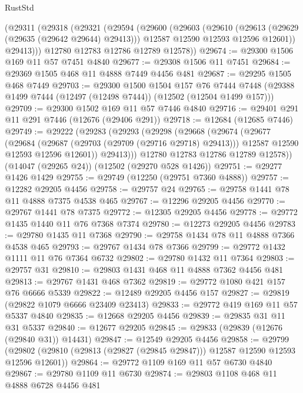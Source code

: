 \begin{lexlean}{RustStd}
\begin{coremodule}
    (@29311
      (@29318
        (@29321
          (@29594
            (@29600
              (@29603
                (@29610
                  (@29613 (@29629 (@29635 (@29642 @29644) @29413)))
                  @12587
                  @12590
                  @12593
                  @12596
                  @12601))
              @29413)))
        @12780
        @12783
        @12786
        @12789
        @12578))
@29674 := @29300 @1506 @169 @11 @57 @7451 @4840
@29677 := @29308 @1506 @11 @7451
@29684 := @29369 @1505 @468 @11 @4888 @7449 @4456 @481
@29687 := @29295 @1505 @468 @7449
@29703 := @29300
    @1500
    @1504
    @157
    @76
    @7444
    @7448
    (@29388 @1499 @7444 (@12497 (@12498 @7444)) (@12502 (@12504 @1499 @157)))
@29709 := @29300 @1502 @169 @11 @57 @7446 @4840
@29716 := @29401 @291 @11 @291 @7446 (@12676 (@29406 @291))
@29718 := @12684 (@12685 @7446)
@29749 := @29222
    (@29283
      (@29293
        (@29298
          (@29668
            (@29674
              (@29677
                (@29684
                  (@29687 (@29703 (@29709 (@29716 @29718) @29413)))
                  @12587
                  @12590
                  @12593
                  @12596
                  @12601))
              @29413)))
        @12780
        @12783
        @12786
        @12789
        @12578))
    (@14047 (@29265 @24))
    (@12502 (@29270 @528 @1426))
@29751 := @29277 @1426 @1429
@29755 := @29749 (@12250 (@29751 @7360 @4888))
@29757 := @12282 @29205 @4456
@29758 := @29757 @24
@29765 := @29758 @1441 @78 @11 @4888 @7375 @4538 @465
@29767 := @12296 @29205 @4456
@29770 := @29767 @1441 @78 @7375
@29772 := @12305 @29205 @4456
@29778 := @29772 @1435 @1440 @11 @76 @7368 @7374
@29780 := @12273 @29205 @4456
@29783 := @29780 @1435 @11 @7368
@29790 := @29758 @1434 @78 @11 @4888 @7366 @4538 @465
@29793 := @29767 @1434 @78 @7366
@29799 := @29772 @1432 @1111 @11 @76 @7364 @6732
@29802 := @29780 @1432 @11 @7364
@29803 := @29757 @31
@29810 := @29803 @1431 @468 @11 @4888 @7362 @4456 @481
@29813 := @29767 @1431 @468 @7362
@29819 := @29772 @1080 @421 @157 @76 @6666 @5339
@29822 := @12489 @29205 @4456 @157
@29827 := @29819 (@29822 @1079 @6666 @23409 @23413)
@29833 := @29772 @419 @169 @11 @57 @5337 @4840
@29835 := @12668 @29205 @4456
@29839 := @29835 @31 @11 @31 @5337
@29840 := @12677 @29205
@29845 := @29833 (@29839 (@12676 (@29840 @31)) @14431)
@29847 := @12549 @29205 @4456
@29858 := @29799
    (@29802 (@29810 (@29813 (@29827 (@29845 @29847))) @12587 @12590 @12593 @12596 @12601))
@29864 := @29772 @1109 @169 @11 @57 @6730 @4840
@29867 := @29780 @1109 @11 @6730
@29874 := @29803 @1108 @468 @11 @4888 @6728 @4456 @481

\end{coremodule}
\end{lexlean}
